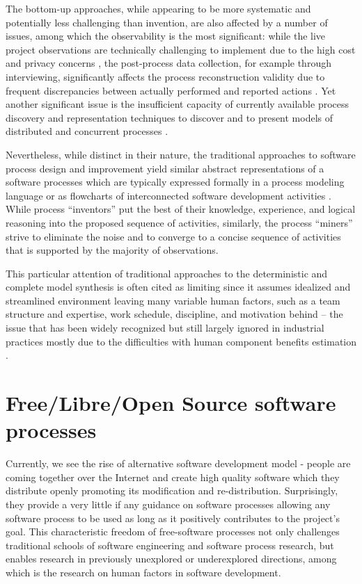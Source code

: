 The bottom-up approaches, while appearing to be more systematic and potentially less challenging than invention, 
are also affected by a number of issues, among which the observability is the most significant: 
while the live project observations are technically challenging to implement due to the high cost and 
privacy concerns \cite{citeulike:12944447}, the post-process data collection, for example through interviewing, 
significantly affects the process reconstruction validity due to frequent discrepancies between actually 
performed and reported actions \cite{citeulike:7691059}. 
Yet another significant issue is the insufficient capacity of currently available process discovery and 
representation techniques to discover and to present models of distributed and concurrent processes 
\cite{citeulike:12944447}. 

Nevertheless, while distinct in their nature, the traditional approaches to software process design and 
improvement yield similar abstract representations of a software processes which are typically expressed 
formally in a process modeling language or as flowcharts of interconnected software 
development activities \cite{citeulike:12944447} \cite{citeulike:12944456}.
While process ``inventors'' put the best of their knowledge, experience, and logical reasoning into the proposed 
sequence of activities, similarly, the process ``miners'' strive to eliminate the noise and to converge to a 
concise sequence of activities that is supported by the majority of observations. 

This particular attention of traditional approaches to the deterministic and complete model synthesis 
is often cited as limiting since it assumes idealized and streamlined environment leaving many variable 
human factors, such as a team structure and expertise, work schedule, discipline, and motivation behind 
-- the issue that has been widely recognized 
\cite{citeulike:149387} \cite{citeulike:113403} \cite{citeulike:205322} \cite{citeulike:12798652} 
but still largely ignored in industrial practices mostly due to the  difficulties with human component 
benefits estimation \cite{citeulike:12798659} \cite{citeulike:12798662} \cite{csdl2-12-11}.

%
%
\section{Free/Libre/Open Source software processes}
Currently, we see the rise of alternative software development model - people are coming together 
over the Internet and create high quality software which they distribute openly promoting its 
modification and re-distribution. 
Surprisingly, they provide a very little if any guidance on software processes allowing any software 
process to be used as long as it positively contributes to the project's goal. 
This characteristic freedom of free-software processes not only challenges traditional schools of 
software engineering and software process research, but enables research in previously unexplored or 
underexplored directions, among which is the research on human factors in software development.

